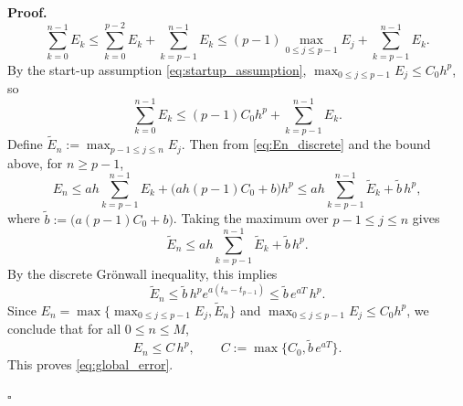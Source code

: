 \documentclass[10pt,a4paper]{amsart}
\newenvironment{pf}{\noindent\textbf{Proof.}}{\hfill$\square$}
\begin{document}
\begin{pf}
\begin{equation*}
\sum_{k=0}^{n-1}E_k
\le \sum_{k=0}^{p-2}E_k + \sum_{k=p-1}^{n-1}E_k
\le (p-1)\max_{0\le j\le p-1}E_j + \sum_{k=p-1}^{n-1}E_k.
\end{equation*}
By the start-up assumption \eqref{eq:startup_assumption},
$\max_{0\le j\le p-1}E_j\le C_0 h^p$, so
\begin{equation*}
\sum_{k=0}^{n-1}E_k \le (p-1)C_0 h^p + \sum_{k=p-1}^{n-1}E_k.
\end{equation*}
Define $\widetilde E_n:=\max_{p-1\le j\le n}E_j$. Then from \eqref{eq:En_discrete} and the bound above,
for $n\ge p-1$,
\begin{equation*}
E_n \le a h\sum_{k=p-1}^{n-1}E_k + \bigl(a h (p-1)C_0 + b\bigr)h^p
\le a h\sum_{k=p-1}^{n-1}\widetilde E_k + \widetilde b\,h^p,
\end{equation*}
where $\widetilde b:=\bigl(a (p-1)C_0 + b\bigr)$.
Taking the maximum over $p-1\le j\le n$ gives
\begin{equation*}
\widetilde E_n \le a h\sum_{k=p-1}^{n-1}\widetilde E_k + \widetilde b\,h^p.
\end{equation*}
By the discrete Gr\"onwall inequality, this implies
\begin{equation*}
\widetilde E_n \le \widetilde b\,h^p e^{a(t_n-t_{p-1})}
\le \widetilde b\,e^{aT}\,h^p.
\end{equation*}
Since $E_n=\max\{\max_{0\le j\le p-1}E_j,\widetilde E_n\}$ and $\max_{0\le j\le p-1}E_j\le C_0 h^p$,
we conclude that for all $0\le n\le M$,
\begin{equation*}
E_n \le C\,h^p,
\qquad
C:=\max\{C_0,\widetilde b\,e^{aT}\}.
\end{equation*}
This proves \eqref{eq:global_error}.

\end{pf}
\end{document}
